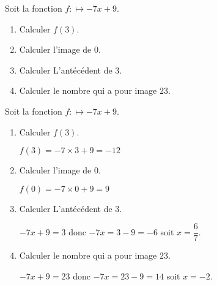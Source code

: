 \begin{exercice}
    Soit la fonction $f:\longmapsto -7x+9$.
    \begin{enumerate}        
        \item Calculer $f(3)$.
        \item Calculer l'image de $0$.
        \item Calculer L'antécédent de $3$.
        \item Calculer le nombre qui a pour image $23$.
    \end{enumerate}
\end{exercice}
\begin{corrige}
    Soit la fonction $f:\longmapsto -7x+9$.

    \begin{enumerate}        
        \item Calculer $f(3)$.
        
        {\red $f(3) = -7\times 3 + 9 = -12$}
        \item Calculer l'image de $0$.
        
        {\red $f(0) = -7\times 0 + 9 = 9$}
        \item Calculer L'antécédent de $3$.
        
        {\red $-7x + 9 = 3$ donc $-7x=3-9=-6$ soit $x=\dfrac{6}{7}$.}
        \item Calculer le nombre qui a pour image $23$.
        
        {\red $-7x+9=23$ donc $-7x=23-9=14$ soit $x=-2$.}
    \end{enumerate}
\end{corrige}
